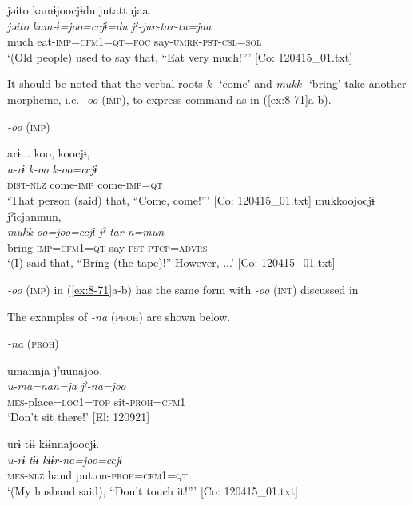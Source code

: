 \ex
{\TM}
\glll  jəito  kamɨjoocjɨdu  jutattujaa.\\
\textit{jəito}  \textit{kam-ɨ=joo=ccjɨ=du}  \textit{jˀ-jur-tar-tu=jaa}\\
much  eat-\textsc{imp}=\textsc{cfm1}=\textsc{qt}=\textsc{foc}  say-\textsc{umrk}-\textsc{pst}-\textsc{csl}=\textsc{sol}\\
\glt ‘(Old people) used to say that, “Eat very much!”’ [Co: 120415\_01.txt]
\z
\z

It should be noted that the verbal roots \textit{k-} ‘come’ and \textit{mukk-} ‘bring’ take another morpheme, i.e. \textit{-oo} (\textsc{imp}), to express command as in (\ref{ex:8-71}a-b).

\ea\label{ex:8-71}
  \textit{-oo} (\textsc{imp})

\ea
{\TM}
\glll  arɨ ..  koo,  koocjɨ,\\
\textit{a-rɨ}  \textit{k-oo}  \textit{k-oo=ccjɨ}\\
\textsc{dist}-\textsc{nlz}  come-\textsc{imp}  come-\textsc{imp}=\textsc{qt}\\
\glt ‘That person (said) that, “Come, come!”’ [Co: 120415\_01.txt]
\ex
{\TM}
\glll  mukkoojocjɨ  jˀicjanmun,\\
\textit{mukk-oo=joo=ccjɨ}  \textit{jˀ-tar-n=mun}\\
bring-\textsc{imp}=\textsc{cfm1}=\textsc{qt}  say-\textsc{pst}-\textsc{ptcp}=\textsc{advrs}\\
\glt ‘(I) said that, “Bring (the tape)!” However, ...’ [Co: 120415\_01.txt]
\z
\z

\textit{-oo} (\textsc{imp}) in (\ref{ex:8-71}a-b) has the same form with \textit{-oo} (\textsc{int}) discussed in 

  The examples of \textit{-na} (\textsc{proh}) are shown below.

\ea\label{ex:8-72}
  \textit{-na} (\textsc{proh})

\ea
{\TM}
\glll  umannja  jˀuunajoo.\\
\textit{u-ma=nan=ja}  \textit{jˀ-na=joo}\\
\textsc{mes}-place=\textsc{loc1}=\textsc{top}  sit-\textsc{proh}=\textsc{cfm1}\\
\glt ‘Don’t sit there!’ [El: 120921]

\ex
{\TM}
\glll  urɨ  tɨɨ  kɨɨnnajoocjɨ.\\
\textit{u-rɨ}  \textit{tɨɨ}  \textit{kɨɨr-na=joo=ccjɨ}\\
\textsc{mes}-\textsc{nlz}  hand  put.on-\textsc{proh}=\textsc{cfm1}=\textsc{qt}\\
\glt ‘(My husband said), “Don’t touch it!”’ [Co: 120415\_01.txt]
\z
\z

